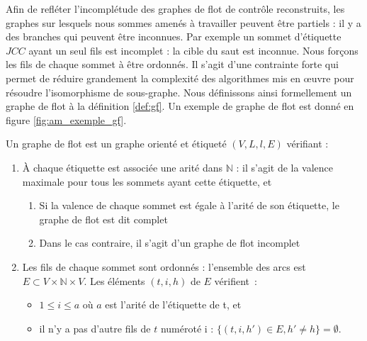 Afin de refléter l'incomplétude des graphes de flot de contrôle reconstruits, les graphes sur lesquels nous sommes amenés à travailler peuvent être partiels : il y a des branches qui peuvent être inconnues.
Par exemple un sommet d'étiquette $JCC$ ayant un seul fils est incomplet : la cible du saut est inconnue.
Nous forçons les fils de chaque sommet à être ordonnés. Il s'agit d'une contrainte forte qui permet de réduire grandement la complexité des algorithmes mis en \oe uvre pour résoudre l'isomorphisme de sous-graphe.
Nous définissons ainsi formellement un graphe de flot à la définition \ref{def:gf}.
Un exemple de graphe de flot est donné en figure \ref{fig:am_exemple_gf}.

\begin{defi}\label{def:gf}
Un graphe de flot est un graphe orienté et étiqueté $(V, L, l, E)$ vérifiant :
\begin{enumerate}
\item À chaque étiquette est associée une arité dans $\mathbb{N}$ : il s'agit de la valence maximale pour tous les sommets ayant cette étiquette, et
 \begin{enumerate}
  \item Si la valence de chaque sommet est égale à l'arité de son étiquette, le graphe de flot est dit complet
  \item Dans le cas contraire, il s'agit d'un graphe de flot incomplet
 \end{enumerate}
 \item Les fils de chaque sommet sont ordonnés : 
       l'ensemble des arcs est $E\subset V\times \mathbb{N}\times V$. Les éléments $(t, i, h)$ de $E$ vérifient~: 
       \begin{itemize}
        \item $1\leq i\leq a$ où $a$ est l'arité de l'étiquette de t, et
        \item il n'y a pas d'autre fils de $t$ numéroté i : $\{(t, i, h')\in E, h'\ne h\}=\emptyset$.
       \end{itemize}
\end{enumerate}
\end{defi}

